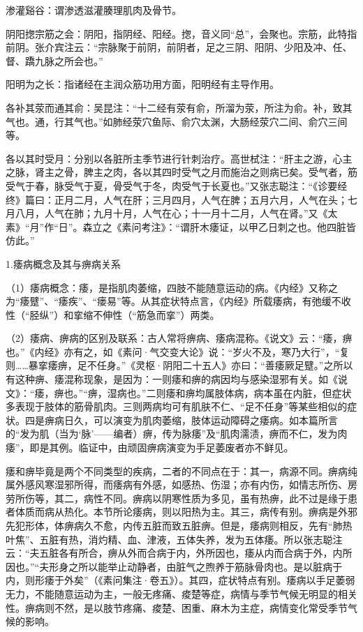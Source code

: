 \documentclass[draft,12pt]{ctexbook}
\begin{document}
\begin{jiaozhu}
	\item 渗灌谿谷：谓渗透滋灌腠理肌肉及骨节。
	\item 阴阳揔宗筋之会：阴阳，指阴经、阳经。揔，音义同“总”，会聚也。宗筋，此特指前阴。张介宾注云：“宗脉聚于前阴，前阴者，足之三阴、阳阴、少阳及冲、任、督、蹻九脉之所会也。”
	\item 阳明为之长：指诸经在主润众筋功用方面，阳明经有主导作用。
	\item 各补其荥而通其俞：吴昆注：“十二经有荥有俞，所溜为荥，所注为俞。补，致其气也。通，行其气也。”如肺经荥穴鱼际、俞穴太渊，大肠经荥穴二间、俞穴三间等。
	\item 各以其时受月：分别以各脏所主季节进行针刺治疗。高世栻注：“肝主之游，心主之脉，肾主之骨，脾主之肉，各以其四时受气之月而施治之则病已矣。受气者，筋受气于春，脉受气于夏，骨受气于冬，肉受气于长夏也。”又张志聪注：“《诊要经终》篇曰：正月二月，人气在肝；三月四月，人气在脾；五月六月，人气在头；七月八月，人气在肺；九月十月，人气在心；十一月十二月，人气在肾。”又《太素》“月”作“日”。森立之《素问考注》：“谓肝木痿证，以甲乙日刺之也。他四脏皆仿此。”
\end{jiaozhu}


1.痿病概念及其与痹病关系

（1）痿病概念：痿，是指肌肉萎缩，四肢不能随意运动的病。《内经》又称之为“痿躄”、“痿疾”、“瘘易”等。从其症状特点言，《内经》所载痿病，有弛缓不收性（“胫纵”）和挛缩不伸性（“筋急而挛”）两类。

（2）痿病、痹病的区别及联系：古人常将痹病、痿病混称。《说文》云：“痿，痹也。”《内经》亦有之，如《素问·气交变大论》说：“岁火不及，寒乃大行”，“复则……暴挛痿痹，足不任身。”《灵枢·阴阳二十五人》亦曰：“善痿厥足躄。”之所以有这种痹、痿混称现象，是因为：一则痿和痹的病因均与感染湿邪有关。如《说文》：“痿，痹也。”“痹，湿病也。”二则痿和痹均属肢体病，病本虽在内脏，但症状多表现于肢体的筋骨肌肉。三则两病均可有肌肤不仁、“足不任身”等某些相似的症状。四是痹病日久，可以演变为肌肉萎缩，肢体运动障碍之痿病。如本篇所言的“发为肌（当为‘脉’——编者）痹，传为脉痿”及“肌肉濡渍，痹而不仁，发为肉痿”，即是其例。临证中，由顽固痹病演变为手足萎废者亦不鲜见。

痿和痹毕竟是两个不同类型的疾病，二者的不同点在于：其一，病源不同。痹病纯属外感风寒湿邪所得，而痿病有外感，如感热、伤湿；亦有内伤，如情志所伤、房劳所伤等，其二，病性不同。痹病以阴寒性质为多见，虽有热痹，此不过是缘于患者体质而病从热化。本节所论痿病，则以阳热为主。其三，病传有别。痹病是外邪先犯形体，体痹病久不愈，内传五脏而致五脏痹。但是，痿病则相反，先有“肺热叶焦”、五脏有热，消灼精、血、津液，五体失养，发为五体痿。所以张志聪注云：“夫五脏各有所合，痹从外而合病于内，外所因也，痿从内而合病于外，内所因也。”“夫形身之所以能举止动静者，由脏气之煦养于筋脉骨肉也。是以脏病于内，则形痿于外矣”（《素问集注·卷五》）。其四，症状特点有别。痿病以手足萎弱无力，不能随意运动为主，一般无疼痛、痠楚等症，病情与季节气候无明显的相关性。痹病则不然，是以肢节疼痛、痠楚、困重、麻木为主症，病情变化常受季节气候的影响。
\end{document}
